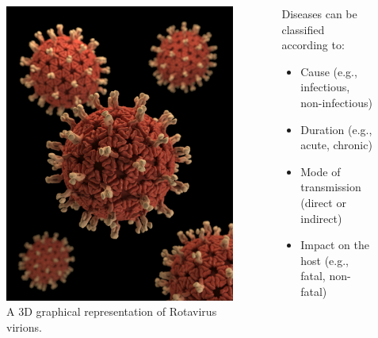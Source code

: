 \documentclass[
  ignorenonframetext,
]{beamer}
\providecommand{\tightlist}{%
  \setlength{\itemsep}{0pt}\setlength{\parskip}{0pt}}\usepackage{longtable,booktabs,array}
\begin{document}
\begin{frame}
\begin{columns}[T]
\begin{column}{0.45\textwidth}
\begin{figure}[H]

{\centering \includegraphics{images/rotavirus.jpeg}

}

\caption{A 3D graphical representation of Rotavirus virions.}

\end{figure}%
\end{column}

\begin{column}{0.55\textwidth}
Diseases can be classified according to:

\begin{itemize}
\tightlist
\item
  {Cause} (e.g., infectious, non-infectious)
\item
  {Duration} (e.g., acute, chronic)
\item
  {Mode of transmission} (direct or indirect)
\item
  {Impact} on the host (e.g., fatal, non-fatal)
\end{itemize}
\end{column}
\end{columns}
\end{frame}
\end{document}
